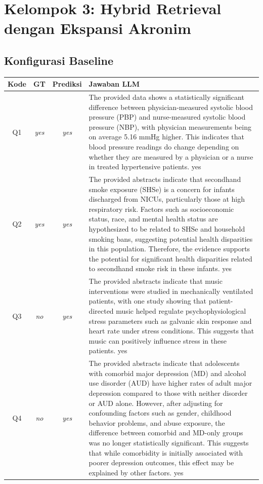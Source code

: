 \section{Kelompok 3: Hybrid Retrieval dengan Ekspansi Akronim}

\subsection*{Konfigurasi Baseline}
\begin{longtable}{@{}c c c >{\raggedright\arraybackslash}p{8.8cm}@{}}
\toprule
\textbf{Kode} & \textbf{GT} & \textbf{Prediksi} & \textbf{Jawaban LLM} \\
\midrule\endhead
Q1 & \textit{yes} & \textit{yes} & The provided data shows a statistically significant difference between physician-measured systolic blood pressure (PBP) and nurse-measured systolic blood pressure (NBP), with physician measurements being on average 5.16 mmHg higher. This indicates that blood pressure readings do change depending on whether they are measured by a physician or a nurse in treated hypertensive patients. yes \\
\addlinespace
Q2 & \textit{yes} & \textit{yes} & The provided abstracts indicate that secondhand smoke exposure (SHSe) is a concern for infants discharged from NICUs, particularly those at high respiratory risk. Factors such as socioeconomic status, race, and mental health status are hypothesized to be related to SHSe and household smoking bans, suggesting potential health disparities in this population. Therefore, the evidence supports the potential for significant health disparities related to secondhand smoke risk in these infants. yes \\
\addlinespace
Q3 & \textit{no} & \textit{yes} & The provided abstracts indicate that music interventions were studied in mechanically ventilated patients, with one study showing that patient-directed music helped regulate psychophysiological stress parameters such as galvanic skin response and heart rate under stress conditions. This suggests that music can positively influence stress in these patients. yes \\
\addlinespace
Q4 & \textit{no} & \textit{yes} & The provided abstracts indicate that adolescents with comorbid major depression (MD) and alcohol use disorder (AUD) have higher rates of adult major depression compared to those with neither disorder or AUD alone. However, after adjusting for confounding factors such as gender, childhood behavior problems, and abuse exposure, the difference between comorbid and MD-only groups was no longer statistically significant. This suggests that while comorbidity is initially associated with poorer depression outcomes, this effect may be explained by other factors. yes \\

\end{longtable}
